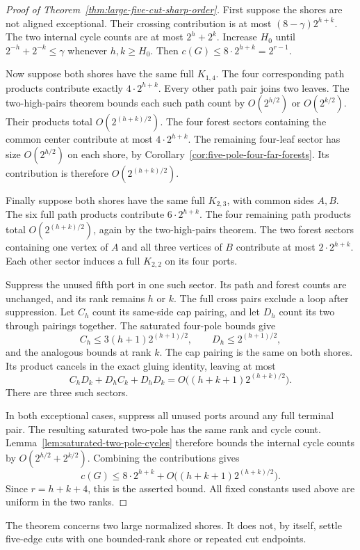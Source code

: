 \begin{proof}[Proof of Theorem~\ref{thm:large-five-cut-sharp-order}]
First suppose the shores are not aligned exceptional.
Their crossing contribution is at most $(8-\gamma)2^{h+k}$.
The two internal cycle counts are at most $2^h+2^k$.
Increase $H_0$ until $2^{-h}+2^{-k}\le\gamma$ whenever $h,k\ge H_0$.
Then $c(G)\le8\cdot2^{h+k}=2^{r-1}$.

Now suppose both shores have the same full $K_{1,4}$.
The four corresponding path products contribute exactly $4\cdot2^{h+k}$.
Every other path pair joins two leaves.
The two-high-pairs theorem bounds each such path count by $O(2^{h/2})$ or $O(2^{k/2})$.
Their products total $O(2^{(h+k)/2})$.
The four forest sectors containing the common center contribute at most $4\cdot2^{h+k}$.
The remaining four-leaf sector has size $O(2^{h/2})$ on each shore, by Corollary~\ref{cor:five-pole-four-far-forests}.
Its contribution is therefore $O(2^{(h+k)/2})$.

Finally suppose both shores have the same full $K_{2,3}$, with common sides $A,B$.
The six full path products contribute $6\cdot2^{h+k}$.
The four remaining path products total $O(2^{(h+k)/2})$, again by the two-high-pairs theorem.
The two forest sectors containing one vertex of $A$ and all three vertices of $B$ contribute at most $2\cdot2^{h+k}$.
Each other sector induces a full $K_{2,2}$ on its four ports.

Suppress the unused fifth port in one such sector.
Its path and forest counts are unchanged, and its rank remains $h$ or $k$.
The full cross pairs exclude a loop after suppression.
Let $C_h$ count its same-side cap pairing, and let $D_h$ count its two through pairings together.
The saturated four-pole bounds give
\[
 C_h\le3(h+1)2^{(h+1)/2},\qquad D_h\le2^{(h+1)/2},
\]
and the analogous bounds at rank $k$.
The cap pairing is the same on both shores.
Its product cancels in the exact gluing identity, leaving at most
\[
 C_hD_k+D_hC_k+D_hD_k
 =O\bigl((h+k+1)2^{(h+k)/2}\bigr).
\]
There are three such sectors.

In both exceptional cases, suppress all unused ports around any full terminal pair.
The resulting saturated two-pole has the same rank and cycle count.
Lemma~\ref{lem:saturated-two-pole-cycles} therefore bounds the internal cycle counts by $O(2^{h/2}+2^{k/2})$.
Combining the contributions gives
\[
 c(G)\le8\cdot2^{h+k}+O\bigl((h+k+1)2^{(h+k)/2}\bigr).
\]
Since $r=h+k+4$, this is the asserted bound.
All fixed constants used above are uniform in the two ranks.
\end{proof}

The theorem concerns two large normalized shores.
It does not, by itself, settle five-edge cuts with one bounded-rank shore or repeated cut endpoints.
